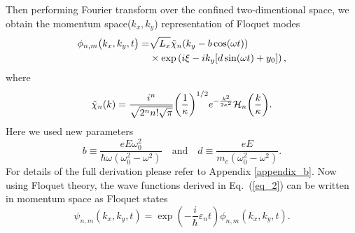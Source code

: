 Then performing Fourier transform over the confined two-dimentional space, we obtain the momentum space($k_x,k_y$) representation of Floquet modes
\begin{equation} \label{eq_9}
  \begin{aligned}
    \phi_{n,m}\big(k_x,k_y,t\big)  = &
    {\sqrt{L_x}}
    \tilde{\chi}_{n}\qty(k_y - b\cos(\omega t)) \\
    & \times
    \text{exp}\left(
      i\xi
      -ik_y  \qty[d\sin(\omega t) + y_0]
    \right),
  \end{aligned}
\end{equation}
where
\begin{equation} \label{eq_10}
  \tilde{\chi}_{n}\qty(k) =
  \frac{i^n}{\sqrt{2^{n} n! \sqrt{\pi}}}
  \qty(\frac{1}{\kappa})^{1/2}
  e^{-\frac{k^2}{2 \kappa^2}}
  \mathcal{H}_{n} \qty(\frac{k}{\kappa}).
\end{equation}
Here we used new parameters
\begin{equation} \label{eq_11}
  b \equiv
  \frac{eE\omega_0^2}{\hbar\omega(\omega_0^2 - \omega^2)} \quad \text{and} \quad
  d \equiv
 \frac{eE}{m_e(\omega_0^2 - \omega^2)}.
\end{equation}
For details of the full derivation please refer to Appendix \ref{appendix_b}. Now using Floquet theory, the wave functions derived in Eq.~(\ref{eq_2}) can be written in momentum space as Floquet states
\begin{equation} \label{eq_12}
  \psi_{n,m}(k_x,k_y,t) =
  \exp(-\frac{i}{\hbar}\varepsilon_{n}t)   \phi_{n,m} (k_x,k_y,t).
\end{equation}
